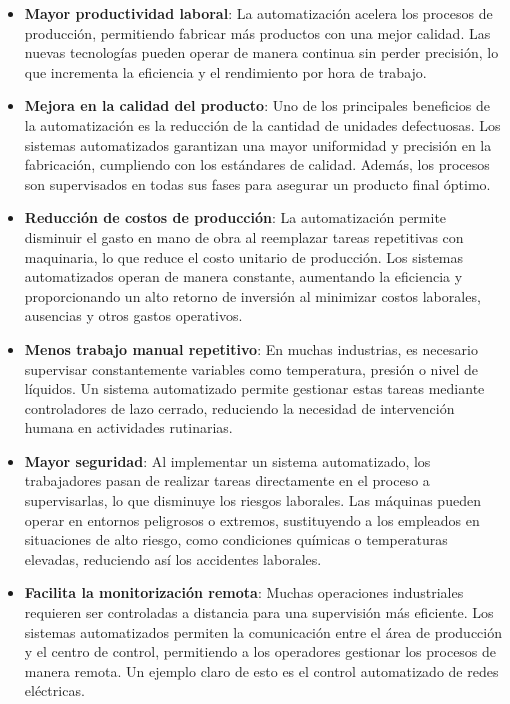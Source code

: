 \begin{itemize}
    \item \textbf{Mayor productividad laboral}: La automatización acelera los procesos de producción, permitiendo fabricar más productos con una mejor calidad. Las nuevas tecnologías pueden operar de manera continua sin perder precisión, lo que incrementa la eficiencia y el rendimiento por hora de trabajo.
    
    \item \textbf{Mejora en la calidad del producto}: Uno de los principales beneficios de la automatización es la reducción de la cantidad de unidades defectuosas. Los sistemas automatizados garantizan una mayor uniformidad y precisión en la fabricación, cumpliendo con los estándares de calidad. Además, los procesos son supervisados en todas sus fases para asegurar un producto final óptimo.
    
    \item \textbf{Reducción de costos de producción}: La automatización permite disminuir el gasto en mano de obra al reemplazar tareas repetitivas con maquinaria, lo que reduce el costo unitario de producción. Los sistemas automatizados operan de manera constante, aumentando la eficiencia y proporcionando un alto retorno de inversión al minimizar costos laborales, ausencias y otros gastos operativos.
    
    \item \textbf{Menos trabajo manual repetitivo}: En muchas industrias, es necesario supervisar constantemente variables como temperatura, presión o nivel de líquidos. Un sistema automatizado permite gestionar estas tareas mediante controladores de lazo cerrado, reduciendo la necesidad de intervención humana en actividades rutinarias.
    
    \item \textbf{Mayor seguridad}: Al implementar un sistema automatizado, los trabajadores pasan de realizar tareas directamente en el proceso a supervisarlas, lo que disminuye los riesgos laborales. Las máquinas pueden operar en entornos peligrosos o extremos, sustituyendo a los empleados en situaciones de alto riesgo, como condiciones químicas o temperaturas elevadas, reduciendo así los accidentes laborales.
    
    \item \textbf{Facilita la monitorización remota}: Muchas operaciones industriales requieren ser controladas a distancia para una supervisión más eficiente. Los sistemas automatizados permiten la comunicación entre el área de producción y el centro de control, permitiendo a los operadores gestionar los procesos de manera remota. Un ejemplo claro de esto es el control automatizado de redes eléctricas.
\end{itemize}

